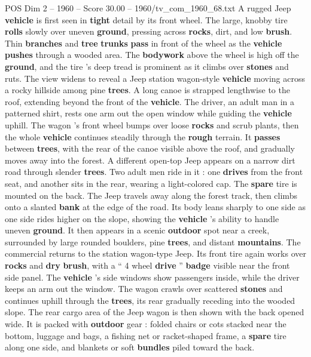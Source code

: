 \begin{textsample}{POS Dim 2 – 1960 – Score 30.00 – 1960/tv\_com\_1960\_68.txt}  \label{ex:f2_pos_004}
A rugged Jeep \textbf{vehicle} is first seen in \textbf{tight} detail by its front wheel.
The large, knobby tire \textbf{rolls} slowly over uneven \textbf{ground}, pressing across \textbf{rocks}, dirt, and low \textbf{brush}.
Thin \textbf{branches} and \textbf{tree} \textbf{trunks} \textbf{pass} in front of the wheel as the \textbf{vehicle} \textbf{pushes} through a wooded area.
The \textbf{bodywork} above the wheel is high off the \textbf{ground}, and the tire ’s deep tread is prominent as it climbs over \textbf{stones} and ruts.
The view widens to reveal a Jeep station wagon-style \textbf{vehicle} moving across a rocky hillside among pine \textbf{trees}.
A long canoe is strapped lengthwise to the roof, extending beyond the front of the \textbf{vehicle}.
The driver, an adult man in a patterned shirt, rests one arm out the open window while guiding the \textbf{vehicle} uphill.
The wagon ’s front wheel bumps over loose \textbf{rocks} and scrub plants, then the whole \textbf{vehicle} continues steadily through the \textbf{rough} terrain.
It \textbf{passes} between \textbf{trees}, with the rear of the canoe visible above the roof, and gradually moves away into the forest.
A different open-top Jeep appears on a narrow dirt road through slender \textbf{trees}.
Two adult men ride in it : one \textbf{drives} from the front seat, and another sits in the rear, wearing a light-colored cap.
The \textbf{spare} tire is mounted on the back.
The Jeep travels away along the forest track, then climbs onto a slanted \textbf{bank} at the edge of the road.
Its body leans sharply to one side as one side rides higher on the slope, showing the \textbf{vehicle} ’s ability to handle uneven \textbf{ground}.
It then appears in a scenic \textbf{outdoor} spot near a creek, surrounded by large rounded boulders, pine \textbf{trees}, and distant \textbf{mountains}.
The commercial returns to the station wagon-type Jeep.
Its front tire again works over \textbf{rocks} and \textbf{dry} \textbf{brush}, with a “ 4 wheel \textbf{drive} ” \textbf{badge} visible near the front side panel.
The \textbf{vehicle} ’s side windows show passengers inside, while the driver keeps an arm out the window.
The wagon crawls over scattered \textbf{stones} and continues uphill through the \textbf{trees}, its rear gradually receding into the wooded slope.
The rear cargo area of the Jeep wagon is then shown with the back opened wide.
It is packed with \textbf{outdoor} gear : folded chairs or cots stacked near the bottom, luggage and bags, a fishing net or racket-shaped frame, a \textbf{spare} tire along one side, and blankets or soft \textbf{bundles} piled toward the back.

\end{textsample}
